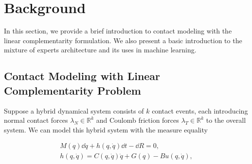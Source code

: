 
\section{Background}

In this section, we provide a brief introduction to contact modeling with the
linear complementarity formulation.
%
We also present a basic introduction to the mixture of experts architecture and
its uses in machine learning.

\subsection{Contact Modeling with Linear Complementarity Problem}

Suppose a hybrid dynamical system consists of $k$ contact events, each
introducing normal contact forces $\lambda_N \in \mathbb{R}^{k}$ and Coulomb
friction forces $\lambda_T \in \mathbb{R}^{k}$ to the overall system.
%
We can model this hybrid system with the measure equality~\cite{glocker2005formulation}

\begin{equation}
  \begin{gathered}
    M(q) \dd \dot{q} + h(q, \dot{q})\dd t - \dd R  = 0, \\
    h(q, \dot{q}) = C(q, \dot{q})\dot{q} + G(q) - Bu(q, \dot{q}), 
  \end{gathered}
  \label{eq:hybrid_dynamics}
\end{equation}

